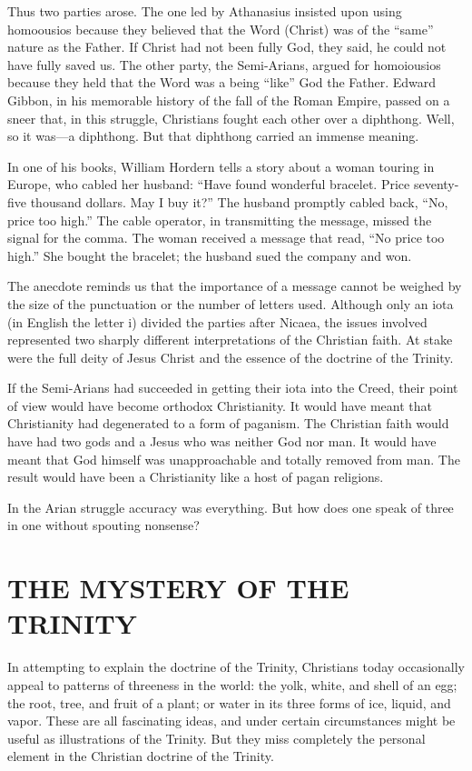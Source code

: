Thus two parties arose. The one led by Athanasius insisted upon using homoousios because they
believed that the Word (Christ) was of the “same” nature as the Father. If Christ had not been fully
God, they said, he could not have fully saved us. The other party, the Semi-Arians, argued for
homoiousios because they held that the Word was a being “like” God the Father. Edward Gibbon, in his
memorable history of the fall of the Roman Empire, passed on a sneer that, in this struggle,
Christians fought each other over a diphthong. Well, so it was—a diphthong. But that diphthong
carried an immense meaning.

In one of his books, William Hordern tells a story about a woman touring in Europe, who cabled her
husband: “Have found wonderful bracelet. Price seventy-five thousand dollars. May I buy it?” The
husband promptly cabled back, “No, price too high.” The cable operator, in transmitting the message,
missed the signal for the comma. The woman received a message that read, “No price too high.” She
bought the bracelet; the husband sued the company and won.

The anecdote reminds us that the importance of a message cannot be weighed by the size of the
punctuation or the number of letters used. Although only an iota (in English the letter i) divided
the parties after Nicaea, the issues involved represented two sharply different interpretations of
the Christian faith. At stake were the full deity of Jesus Christ and the essence of the doctrine of
the Trinity.

If the Semi-Arians had succeeded in getting their iota into the Creed, their point of view would
have become orthodox Christianity. It would have meant that Christianity had degenerated to a form
of paganism. The Christian faith would have had two gods and a Jesus who was neither God nor man. It
would have meant that God himself was unapproachable and totally removed from man. The result would
have been a Christianity like a host of pagan religions.

In the Arian struggle accuracy was everything. But how does one speak of three in one without
spouting nonsense?

\section{THE MYSTERY OF THE TRINITY}

In attempting to explain the doctrine of the Trinity, Christians today occasionally appeal to
patterns of threeness in the world: the yolk, white, and shell of an egg; the root, tree, and fruit
of a plant; or water in its three forms of ice, liquid, and vapor. These are all fascinating ideas,
and under certain circumstances might be useful as illustrations of the Trinity. But they miss
completely the personal element in the Christian doctrine of the Trinity.

